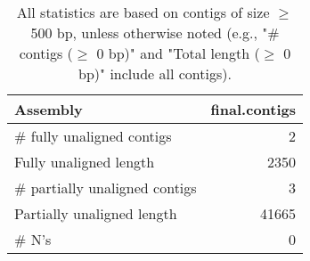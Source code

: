 \documentclass[12pt,a4paper]{article}
\begin{document}
\begin{table}[ht]
\begin{center}
\caption{All statistics are based on contigs of size $\geq$ 500 bp, unless otherwise noted (e.g., "\# contigs ($\geq$ 0 bp)" and "Total length ($\geq$ 0 bp)" include all contigs).}
\begin{tabular}{|l*{1}{|r}|}
\hline
Assembly & final.contigs \\ \hline
\# fully unaligned contigs & 2 \\ \hline
Fully unaligned length & 2350 \\ \hline
\# partially unaligned contigs & 3 \\ \hline
Partially unaligned length & 41665 \\ \hline
\# N's & 0 \\ \hline
\end{tabular}
\end{center}
\end{table}
\end{document}
